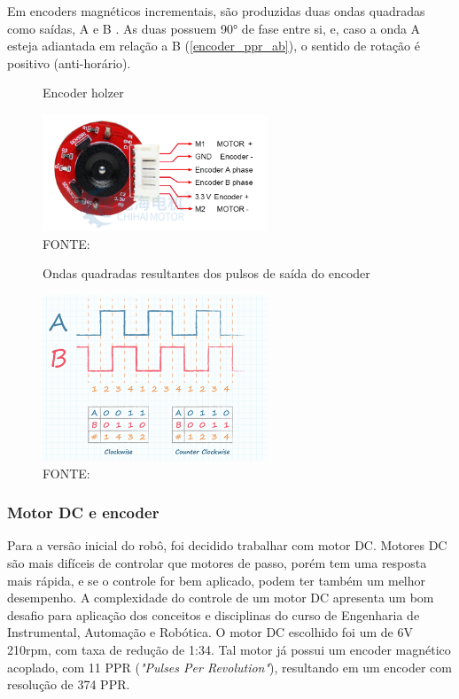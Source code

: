 	Em encoders magnéticos incrementais, são produzidas duas ondas quadradas
	como saídas, A e B \cite{encoder_ppr}. As duas possuem 90° de fase entre si,
	e, caso a onda A esteja adiantada em relação a B (\autoref{encoder_ppr_ab}),
	o sentido de rotação é positivo (anti-horário).

\begin{figure}[ht]
	\centering
	\caption{Encoder holzer}
	\includegraphics[width=0.6\textwidth]{figures/encoder_holzer}
	\caption{FONTE: \cite{motor_dc_6v_encoder}}
\end{figure}

\begin{figure}[ht]
	\centering
	\caption{Ondas quadradas resultantes dos pulsos de saída do encoder}
	\includegraphics[width=0.6\textwidth]{figures/encoder_pulso_ab}
	\caption{FONTE: \cite{encoder_ppr}}
	\label{encoder_ppr_ab}
\end{figure}


\subsubsection{Motor DC e encoder}
Para a versão inicial do robô, foi decidido trabalhar com motor DC.
Motores DC são mais difíceis de controlar que motores de passo, porém tem uma resposta mais rápida, e se o controle for
bem aplicado, podem ter também um melhor desempenho. A complexidade do controle de um motor DC apresenta um bom desafio
para aplicação dos conceitos e disciplinas do curso de Engenharia de Instrumental, Automação e Robótica. O motor DC 
escolhido foi um de 6V 210rpm, com taxa de redução de 1:34. Tal motor já possui um encoder magnético acoplado, com 11
PPR (\textit{"Pulses Per Revolution"}), resultando em um encoder com resolução de 374 PPR.

